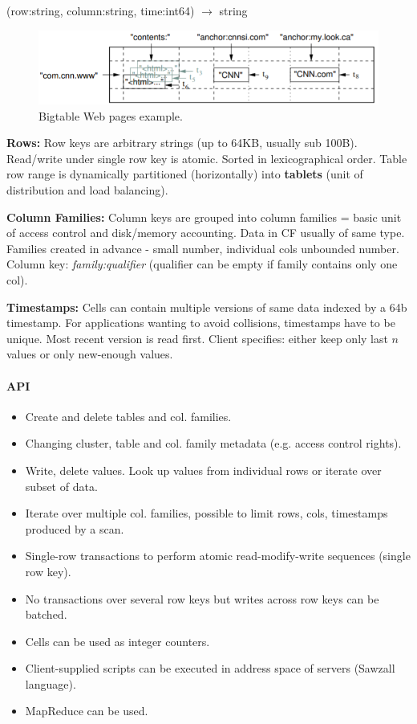 (row:string, column:string, time:int64) $\longrightarrow$ string

\begin{figure}[h]
	\centering
	\includegraphics[scale=0.6]{images/3-bt_ex.PNG}
	\caption{Bigtable Web pages example.}
	\label{fig:bt_ex}
\end{figure}

\textbf{Rows:} Row keys are arbitrary strings (up to 64KB, usually sub 100B). Read/write under single row key is atomic. Sorted in lexicographical order. Table row range is dynamically partitioned (horizontally) into \textbf{tablets} (unit of distribution and load balancing).

\textbf{Column Families:} Column keys are grouped into column families = basic unit of access control and disk/memory accounting. Data in CF usually of same type. Families created in advance - small number, individual cols unbounded number. Column key: \textit{family:qualifier} (qualifier can be empty if family contains only one col).

\textbf{Timestamps:} Cells can contain multiple versions of same data indexed by a 64b timestamp. For applications wanting to avoid collisions, timestamps have to be unique. Most recent version is read first. Client specifies: either keep only last $n$ values or only new-enough values.

\paragraph{API}
\begin{itemize}
    \item Create and delete tables and col. families.
    \item Changing cluster, table and col. family metadata (e.g. access control rights).
    \item Write, delete values. Look up values from individual rows or iterate over subset of data.
    \item Iterate over multiple col. families, possible to limit rows, cols, timestamps produced by a scan.
    \item Single-row transactions to perform atomic read-modify-write sequences (single row key).
    \item No transactions over several row keys but writes across row keys can be batched.
    \item Cells can be used as integer counters.
    \item Client-supplied scripts can be executed in address space of servers (Sawzall language).
    \item MapReduce can be used.
\end{itemize}

